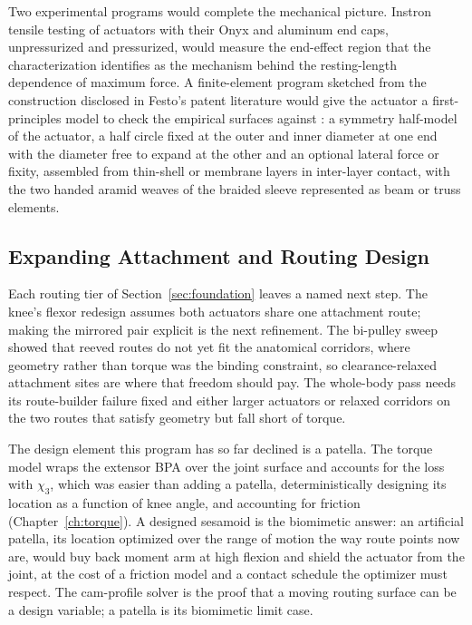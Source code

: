 Two experimental programs would complete the mechanical picture. Instron tensile testing of actuators with their Onyx and aluminum end caps, unpressurized and pressurized, would measure the end-effect region that the characterization identifies as the mechanism behind the resting-length dependence of maximum force. A finite-element program sketched from the construction disclosed in Festo's patent literature would give the actuator a first-principles model to check the empirical surfaces against \citep{festo_2026}: a symmetry half-model of the actuator, a half circle fixed at the outer and inner diameter at one end with the diameter free to expand at the other and an optional lateral force or fixity, assembled from thin-shell or membrane layers in inter-layer contact, with the two handed aramid weaves of the braided sleeve represented as beam or truss elements.

\subsection{Expanding Attachment and Routing Design}\label{sec:fw_routing}

Each routing tier of Section~\ref{sec:foundation} leaves a named next step. The knee's flexor redesign assumes both actuators share one attachment route; making the mirrored pair explicit is the next refinement. The bi-pulley sweep showed that reeved routes do not yet fit the anatomical corridors, where geometry rather than torque was the binding constraint, so clearance-relaxed attachment sites are where that freedom should pay. The whole-body pass needs its route-builder failure fixed and either larger actuators or relaxed corridors on the two routes that satisfy geometry but fall short of torque.

The design element this program has so far declined is a patella. The torque model wraps the extensor BPA over the joint surface and accounts for the loss with $\chi_{3}$, which was easier than adding a patella, deterministically designing its location as a function of knee angle, and accounting for friction (Chapter~\ref{ch:torque}). A designed sesamoid is the biomimetic answer: an artificial patella, its location optimized over the range of motion the way route points now are, would buy back moment arm at high flexion and shield the actuator from the joint, at the cost of a friction model and a contact schedule the optimizer must respect. The cam-profile solver is the proof that a moving routing surface can be a design variable; a patella is its biomimetic limit case.

